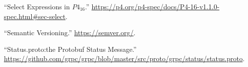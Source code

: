 \documentclass[11pt]{article}
\begin{document}
{{\begin{thebibliography}{35}
\mdbibitemlabel{{}[24]}\textquotedblleft{}Select Expressions in $P4_{16}$.\textquotedblright{} \href{https://p4.org/p4-spec/docs/P4-16-v1.1.0-spec.html\%23sec-select}{{\ttfamily https://\hspace{0pt}p4.\hspace{0pt}org/\hspace{0pt}p4-\hspace{0pt}spec/\hspace{0pt}docs/\hspace{0pt}P4-\hspace{0pt}16-\hspace{0pt}v1.\hspace{0pt}1.\hspace{0pt}0-\hspace{0pt}spec.\hspace{0pt}html\#\hspace{0pt}sec-\hspace{0pt}select}}.\label{p4selectexpr}%

\mdbibitemlabel{{}[25]}\textquotedblleft{}Semantic Versioning.\textquotedblright{} \href{https://semver.org/}{{\ttfamily https://\hspace{0pt}semver.\hspace{0pt}org/\hspace{0pt}}}.\label{semver}%

\mdbibitemlabel{{}[26]}\textquotedblleft{}Status.proto:the Protobuf Status Message.\textquotedblright{} \href{https://github.com/grpc/grpc/blob/master/src/proto/grpc/status/status.proto}{{\ttfamily https://\hspace{0pt}github.\hspace{0pt}com/\hspace{0pt}grpc/\hspace{0pt}grpc/\hspace{0pt}blob/\hspace{0pt}master/\hspace{0pt}src/\hspace{0pt}proto/\hspace{0pt}grpc/\hspace{0pt}status/\hspace{0pt}status.\hspace{0pt}proto}}.\label{protostatus}%


\end{thebibliography}}}
\end{document}
